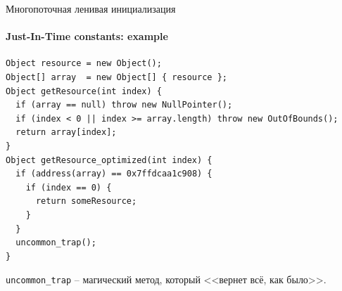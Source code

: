 \begin{frame}{Многопоточная ленивая инициализация}
\framesubtitle{Just-In-Time constants: example}

\begin{verbatim}
Object resource = new Object();
Object[] array  = new Object[] { resource };
Object getResource(int index) {
  if (array == null) throw new NullPointer();
  if (index < 0 || index >= array.length) throw new OutOfBounds();
  return array[index];
}
Object getResource_optimized(int index) {
  if (address(array) == 0x7ffdcaa1c908) {
    if (index == 0) {
      return someResource;
    }
  }
  uncommon_trap();
}
\end{verbatim}

\texttt{uncommon\_trap} -- магический метод, который <<вернет всё, как было>>.

\pause


\end{frame}

% 
% 
% 
% 
% 
% 


